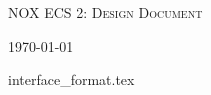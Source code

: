 \documentclass[hidelinks]{article}
\begin{document}
\begin{titlepage}
    \centering
    {\scshape\LARGE NOX ECS 2: Design Document \par}
    \vfill
    {\large \today\par}
\end{titlepage}

\tableofcontents
\pagebreak

{interface_format.tex}

\pagebreak


\end{document}
